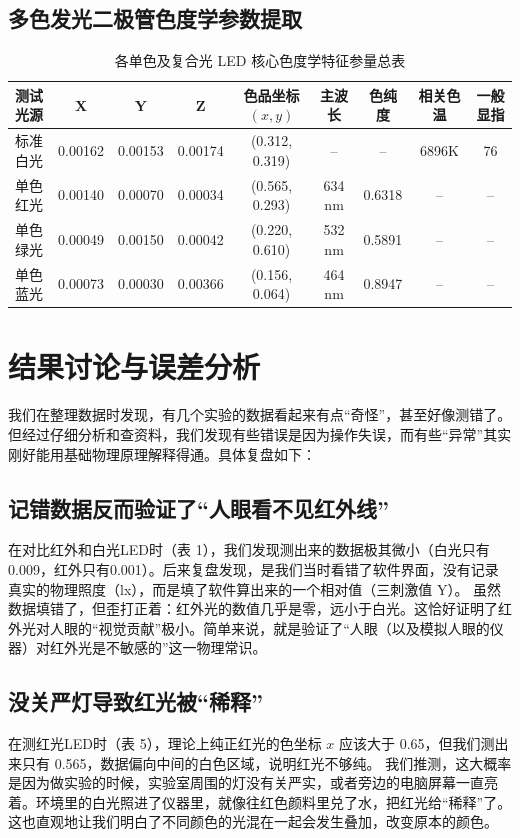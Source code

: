 \documentclass[12pt, a4paper]{article}
\begin{document}
\subsection{多色发光二极管色度学参数提取}
\begin{table}[H]
    \centering
    \caption{各单色及复合光 LED 核心色度学特征参量总表}
    \small
    \begin{tabular}{lcccccccc}
        \toprule
        \textbf{测试光源} & \textbf{X} & \textbf{Y} & \textbf{Z} & \textbf{色品坐标 $(x,y)$} & \textbf{主波长} & \textbf{色纯度} & \textbf{相关色温} & \textbf{一般显指} \\ 
        \midrule
        标准白光 & 0.00162 & 0.00153 & 0.00174 & (0.312, 0.319) & -- & -- & 6896K & 76 \\ 
        单色红光 & 0.00140 & 0.00070 & 0.00034 & (0.565, 0.293) & 634 nm & 0.6318 & -- & -- \\ 
        单色绿光 & 0.00049 & 0.00150 & 0.00042 & (0.220, 0.610) & 532 nm & 0.5891 & -- & -- \\ 
        单色蓝光 & 0.00073 & 0.00030 & 0.00366 & (0.156, 0.064) & 464 nm & 0.8947 & -- & -- \\ 
        \bottomrule
    \end{tabular}
\end{table}


\newpage %
\section{结果讨论与误差分析}

我们在整理数据时发现，有几个实验的数据看起来有点“奇怪”，甚至好像测错了。但经过仔细分析和查资料，我们发现有些错误是因为操作失误，而有些“异常”其实刚好能用基础物理原理解释得通。具体复盘如下：

\subsection{记错数据反而验证了“人眼看不见红外线”}
在对比红外和白光LED时（表 1），我们发现测出来的数据极其微小（白光只有0.009，红外只有0.001）。后来复盘发现，是我们当时看错了软件界面，没有记录真实的物理照度（lx），而是填了软件算出来的一个相对值（三刺激值 Y）。
虽然数据填错了，但歪打正着：红外光的数值几乎是零，远小于白光。这恰好证明了红外光对人眼的“视觉贡献”极小。简单来说，就是验证了“人眼（以及模拟人眼的仪器）对红外光是不敏感的”这一物理常识。

\subsection{没关严灯导致红光被“稀释”}
在测红光LED时（表 5），理论上纯正红光的色坐标 $x$ 应该大于 0.65，但我们测出来只有 0.565，数据偏向中间的白色区域，说明红光不够纯。
我们推测，这大概率是因为做实验的时候，实验室周围的灯没有关严实，或者旁边的电脑屏幕一直亮着。环境里的白光照进了仪器里，就像往红色颜料里兑了水，把红光给“稀释”了。这也直观地让我们明白了不同颜色的光混在一起会发生叠加，改变原本的颜色。
\end{document}

